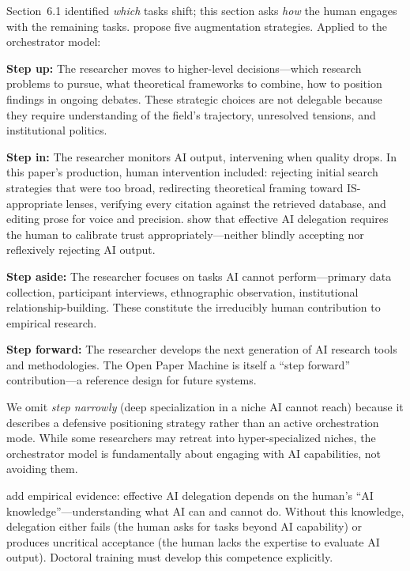 \documentclass{article}
\begin{document}
Section~6.1 identified \textit{which} tasks shift; this section asks \textit{how} the human engages with the remaining tasks. \citet{davenport2016just} propose five augmentation strategies. Applied to the orchestrator model:

\textbf{Step up:} The researcher moves to higher-level decisions---which research problems to pursue, what theoretical frameworks to combine, how to position findings in ongoing debates. These strategic choices are not delegable because they require understanding of the field's trajectory, unresolved tensions, and institutional politics.

\textbf{Step in:} The researcher monitors AI output, intervening when quality drops. In this paper's production, human intervention included: rejecting initial search strategies that were too broad, redirecting theoretical framing toward IS-appropriate lenses, verifying every citation against the retrieved database, and editing prose for voice and precision. \citet{hemmer2023delegation} show that effective AI delegation requires the human to calibrate trust appropriately---neither blindly accepting nor reflexively rejecting AI output.

\textbf{Step aside:} The researcher focuses on tasks AI cannot perform---primary data collection, participant interviews, ethnographic observation, institutional relationship-building. These constitute the irreducibly human contribution to empirical research.

\textbf{Step forward:} The researcher develops the next generation of AI research tools and methodologies. The Open Paper Machine is itself a ``step forward'' contribution---a reference design for future systems.

We omit \textit{step narrowly} (deep specialization in a niche AI cannot reach) because it describes a defensive positioning strategy rather than an active orchestration mode. While some researchers may retreat into hyper-specialized niches, the orchestrator model is fundamentally about engaging with AI capabilities, not avoiding them.

\citet{pinski2023delegation} add empirical evidence: effective AI delegation depends on the human's ``AI knowledge''---understanding what AI can and cannot do. Without this knowledge, delegation either fails (the human asks for tasks beyond AI capability) or produces uncritical acceptance (the human lacks the expertise to evaluate AI output). Doctoral training must develop this competence explicitly.
\end{document}
